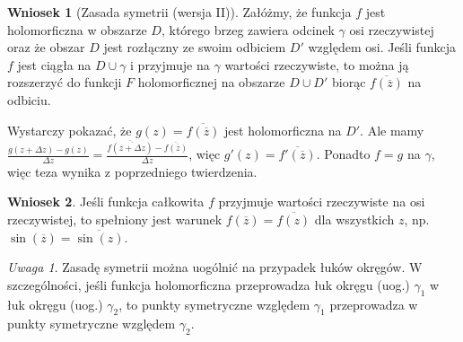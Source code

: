\documentclass[11pt]{article}
\newcommand{\closure}[1]{\overline{#1}} %
\theoremstyle{plain}
\theoremstyle{definition}
\newtheorem*{corollary}{Wniosek}
\theoremstyle{remark}
\newtheorem*{remark}{Uwaga}
\let\oldendproof\endproof
\renewenvironment{proof}[1][\proofname]{
  \oldproof[\textsc{\small #1}]
}{\oldendproof}
\begin{document}
\begin{corollary}[Zasada symetrii (wersja II)]
  Załóżmy, że funkcja $f$ jest holomorficzna w obszarze $D$, którego brzeg zawiera odcinek $\gamma$ osi rzeczywistej oraz że obszar $D$ jest rozłączny ze swoim odbiciem $D'$ względem osi.
  Jeśli funkcja $f$ jest ciągła na $D \cup \gamma$ i przyjmuje na $\gamma$ wartości rzeczywiste, to można ją rozszerzyć do funkcji $F$ holomorficznej na obszarze $D \cup D'$ biorąc $ \closure{f(\closure{z})} $ na odbiciu.
\end{corollary}

\begin{proof}
  Wystarczy pokazać, że $ g(z) = \closure{f(\closure{z})} $ jest holomorficzna na $ D' $.
  Ale mamy $ \frac{g(z + \Delta z) - g(z)}{\Delta z} = \frac{\closure{f(\closure{z + \Delta z})} - \closure{f(\closure{z})}}{\Delta z} $,
  więc $ g'(z) = \closure{f'(\closure{z})} $.
  Ponadto $ f = g $ na $ \gamma $, więc teza wynika z poprzedniego twierdzenia.
\end{proof}

\begin{corollary}
  Jeśli funkcja całkowita $f$ przyjmuje wartości rzeczywiste na osi rzeczywistej, to spełniony jest warunek $ f(\closure{z}) = \closure{f(z)} $ dla wszystkich $z$, np. $ \sin(\closure{z}) = \closure{\sin(z)} $.
\end{corollary}

\begin{remark}
  Zasadę symetrii można uogólnić na przypadek łuków okręgów.
  W szczególności, jeśli funkcja holomorficzna przeprowadza łuk okręgu (uog.) $ \gamma_1 $ w łuk okręgu (uog.) $ \gamma_2 $,
  to punkty symetryczne względem $ \gamma_1 $ przeprowadza w punkty symetryczne względem $ \gamma_2 $.
\end{remark}
\end{document}
